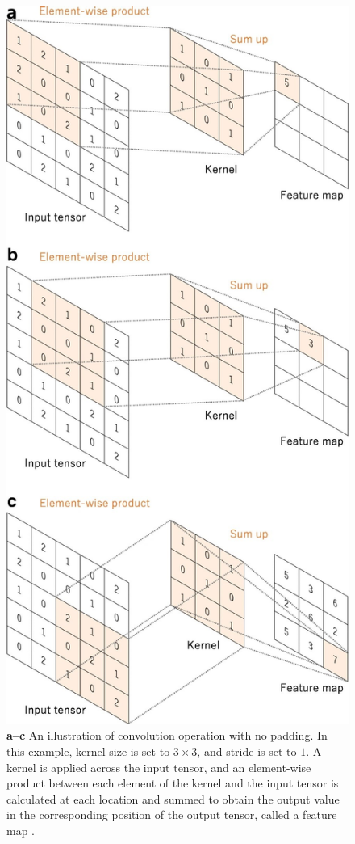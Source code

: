 \begin{figure}[H]
        \begin{center}
	    \includegraphics[scale=0.40]{images/Fundamentals/Convolution.JPG}
	    \caption[An illustration of Convolution Operation.]{\textbf{a–c} An illustration of convolution operation with no padding. In this example, kernel size is set to $3 \times 3$, and stride is set to $1$. A kernel is applied across the input tensor, and an element-wise product between each element of the kernel and the input tensor is calculated at each location and summed to obtain the output value in the corresponding position of the output tensor, called a feature map \cite{articleCNNs}.}
	    \label{fig:Convolution}
	    \end{center}
\end{figure}


